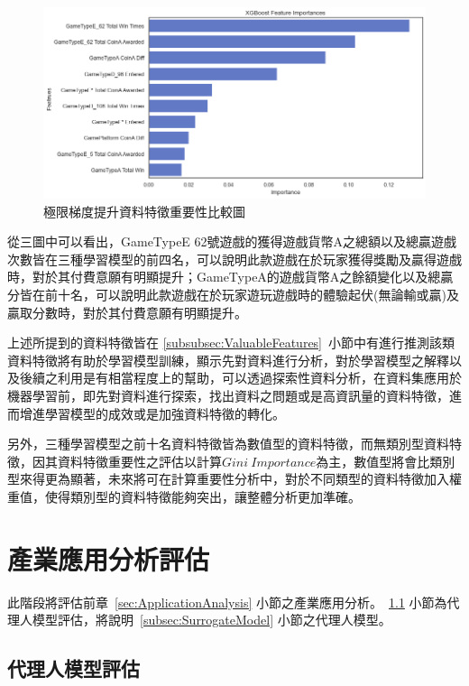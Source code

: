 \begin{figure}[!htb]
    \begin{center}
      \includegraphics[width=1\textwidth]{figures/evaluation/Image_XGBFeatureImportances.png}
      \caption[極限梯度提升資料特徵重要性比較圖]{極限梯度提升資料特徵重要性比較圖}
      \label{fig:eva_XGBFeatureImportances}
    \end{center}
\end{figure}
\newpage

從三圖中可以看出，GameTypeE 62號遊戲的獲得遊戲貨幣A之總額以及總贏遊戲次數皆在三種學習模型的前四名，可以說明此款遊戲在於玩家獲得獎勵及贏得遊戲時，對於其付費意願有明顯提升；GameTypeA的遊戲貨幣A之餘額變化以及總贏分皆在前十名，可以說明此款遊戲在於玩家遊玩遊戲時的體驗起伏(無論輸或贏)及贏取分數時，對於其付費意願有明顯提升。

上述所提到的資料特徵皆在 \ref{subsubsec:ValuableFeatures}~小節中有進行推測該類資料特徵將有助於學習模型訓練，顯示先對資料進行分析，對於學習模型之解釋以及後續之利用是有相當程度上的幫助，可以透過探索性資料分析，在資料集應用於機器學習前，即先對資料進行探索，找出資料之問題或是高資訊量的資料特徵，進而增進學習模型的成效或是加強資料特徵的轉化。

另外，三種學習模型之前十名資料特徵皆為數值型的資料特徵，而無類別型資料特徵，因其資料特徵重要性之評估以計算$Gini\ Importance$為主，數值型將會比類別型來得更為顯著，未來將可在計算重要性分析中，對於不同類型的資料特徵加入權重值，使得類別型的資料特徵能夠突出，讓整體分析更加準確。

\section{產業應用分析評估}
\label{sec:ApplicationAnalysisEvaluation}

此階段將評估前章~\ref{sec:ApplicationAnalysis} 小節之產業應用分析。~\ref{subsec:SurrogateModelEvaluation} 小節為代理人模型評估，將說明~\ref{subsec:SurrogateModel} 小節之代理人模型。

\subsection{代理人模型評估}
\label{subsec:SurrogateModelEvaluation}

\newpage